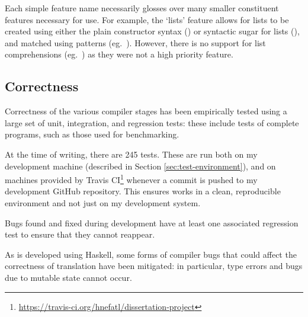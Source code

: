 \documentclass[dissertation.tex]{subfiles}
\begin{document}
{    Each simple feature name necessarily glosses over many smaller constituent features necessary for use. For example, the `lists' feature allows for lists to be created using either the plain constructor syntax () or syntactic sugar for lists (\haskell{[1,2,3]}), and matched using patterns (eg.\ \haskell{[x,y] = [1,2]}). However, there is no support for list comprehensions (eg.\ \haskell{[f x | x <- [1,2,3], even x]}) as they were not a high priority feature.
    
    \subsection{Correctness}
    {
        Correctness of the various compiler stages has been empirically tested using a large set of unit, integration, and regression tests: these include tests of complete programs, such as those used for benchmarking.
        
        At the time of writing, there are 245 tests. These are run both on my development machine (described in Section \ref{sec:test-environment}), and on machines provided by Travis CI\footnote{\url{https://travis-ci.org/hnefatl/dissertation-project}} whenever a commit is pushed to my development GitHub repository. This ensures \compilername works in a clean, reproducible environment and not just on my development system.

        Bugs found and fixed during development have at least one associated regression test to ensure that they cannot reappear.

        As \compilername is developed using Haskell, some forms of compiler bugs that could affect the correctness of translation have been mitigated: in particular, type errors and bugs due to mutable state cannot occur.
    }
}
\end{document}
